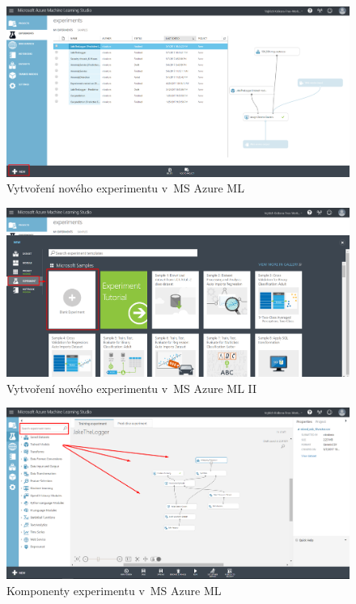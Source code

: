 \documentclass[thesis=M,czech]{FITthesis}[2012/10/20]
\newcommand{\tmpframe}[1]{\fbox{#1}}
\renewcommand{\tmpframe}[1]{#1}
\begin{document}
	\begin{figure}[htb]\centering
		\tmpframe{\includegraphics[width=\textwidth]{./img/azure/experiment01}}	
		\caption{Vytvoření nového experimentu v~MS Azure ML}
		\label{fig:azure-experiment01}
	\end{figure}	
	\begin{figure}[htb]\centering
		\tmpframe{\includegraphics[width=\textwidth]{./img/azure/experiment02}}	
		\caption{Vytvoření nového experimentu v~MS Azure ML II}
		\label{fig:azure-experiment02}
	\end{figure}
	\begin{figure}[htb]\centering
		\tmpframe{\includegraphics[width=\textwidth]{./img/azure/experiment03}}	
		\caption{Komponenty experimentu v~MS Azure ML}
		\label{fig:azure-experiment03}
	\end{figure}
\end{document}
